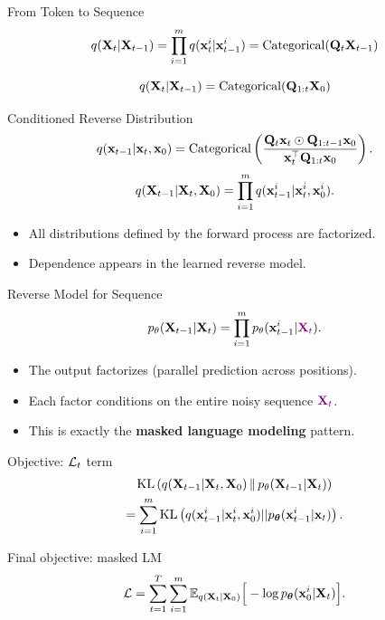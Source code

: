 \documentclass{beamer}
\renewcommand{\eqpause}{}
\begin{document}
\begin{frame}{From Token to Sequence}
    \[
        q(\mathbf{X}_t |\mathbf{X}_{t-1}) =
		\prod_{i=1}^m q(\mathbf{x}_t^i |\mathbf{x}_{t-1}^i) = \mathrm{Categorical}(\mathbf{Q}_t \mathbf{X}_{t-1})
    \]
    \eqpause
    \[
        q(\mathbf{X}_t |\mathbf{X}_{t-1}) = \mathrm{Categorical}(\mathbf{Q}_{1:t} \mathbf{X}_0)
    \]
    \vspace{-0.3cm}
    \eqpause
    \begin{block}{Conditioned Reverse Distribution}
        \[
            q(\mathbf{x}_{t-1} | \mathbf{x}_t, \mathbf{x}_0)
			= \mathrm{Categorical}\left(\frac{\mathbf{Q}_t \mathbf{x}_t \odot \mathbf{Q}_{1:t-1} \mathbf{x}_0}{\mathbf{x}_t^{\top}\mathbf{Q}_{1:t}\mathbf{x}_0}\right).
        \]
        \vspace{-0.3cm}
        \[
            q(\mathbf{X}_{t-1} | \mathbf{X}_t, \mathbf{X}_0) =
            \prod_{i=1}^m q(\mathbf{x}_{t-1}^i |\mathbf{x}_t^i, \mathbf{x}_0^i).
        \]
        \vspace{-0.3cm}
    \end{block}
    \eqpause
    \begin{itemize}
        \item All distributions defined by the forward process are factorized.
        \item Dependence appears in the learned reverse model.
    \end{itemize}
\end{frame}
\begin{frame}{Reverse Model for Sequence}
    \[
        p_\theta(\mathbf{X}_{t-1}|\mathbf{X}_t) =
		\prod_{i=1}^m p_\theta(\mathbf{x}_{t-1}^i | {\color{violet}\mathbf{X}_t}).
    \]
    \vspace{-0.3cm}
    \begin{itemize}
        \item The output factorizes (parallel prediction across positions).
        \item Each factor conditions on the entire noisy sequence ${\color{violet}\mathbf{X}_t}$.
        \item This is exactly the \textbf{masked language modeling} pattern.
    \end{itemize}
    \eqpause
    \begin{block}{Objective: $\mathcal{L}_t$ term}
        \vspace{-0.7cm}
        \begin{multline*}
			\mathrm{KL}\left(q(\mathbf{X}_{t-1}| \mathbf{X}_t, \mathbf{X}_0)\,\|\,p_\theta(\mathbf{X}_{t-1}| \mathbf{X}_t)\right) \\
			= \sum_{i=1}^m \mathrm{KL}\left(q(\mathbf{x}_{t-1}^i|\mathbf{x}_t^i, \mathbf{x}_0^i) || p_{\boldsymbol{\theta}}(\mathbf{x}_{t-1}^i|\mathbf{x}_t)\right).
        \end{multline*}
        \vspace{-0.5cm}
    \end{block}
    \eqpause
    \begin{block}{Final objective: masked LM}
        \vspace{-0.3cm}
        \[
            \mathcal{L} =
            \sum_{t=1}^T \sum_{i=1}^m
            \mathbb{E}_{q(\mathbf{X}_t|\mathbf{X}_0)}
            \Big[-\log p_{\boldsymbol{\theta}}(\mathbf{x}_0^i |\mathbf{X}_t)\Big].
        \]
    \end{block}
\end{frame}
\end{document}
